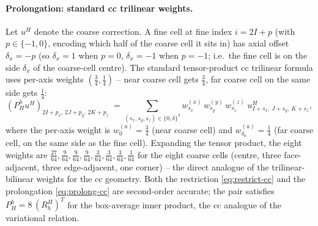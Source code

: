 \documentclass[11pt]{article}
\theoremstyle{definition}
\begin{document}
\paragraph{Prolongation: standard cc trilinear weights.}
Let $u^H$ denote the coarse correction.  A fine cell at fine index
$i = 2I + p$ (with $p \in \{-1, 0\}$, encoding which half of the
coarse cell it sits in) has axial offset $\delta_x = -p$
(so $\delta_x = 1$ when $p = 0$, $\delta_x = -1$ when $p = -1$;
i.e.\ the fine cell is on the side $\delta_x$ of the coarse-cell
centre).  The standard tensor-product cc trilinear formula uses
per-axis weights $(\tfrac{3}{4}, \tfrac{1}{4})$ -- near coarse cell
gets $\tfrac{3}{4}$, far coarse cell on the same side gets
$\tfrac{1}{4}$:
\begin{equation}\label{eq:prolong-cc}
  (P_H^h u^H)_{2I+p_x,\,2J+p_y,\,2K+p_z}
  \;=\!\!\!
  \sum_{(s_x,s_y,s_z)\in\{0,\delta\}^3}\!\!
  w^{(x)}_{s_x}\,w^{(y)}_{s_y}\,w^{(z)}_{s_z}\;
  u^H_{I+s_x,\,J+s_y,\,K+s_z},
\end{equation}
where the per-axis weight is
$w^{(a)}_0 = \tfrac{3}{4}$ (near coarse cell) and
$w^{(a)}_{\delta_a} = \tfrac{1}{4}$ (far coarse cell, on the same
side as the fine cell).  Expanding the tensor product, the eight
weights are $\tfrac{27}{64}, \tfrac{9}{64}, \tfrac{9}{64},
\tfrac{9}{64}, \tfrac{3}{64}, \tfrac{3}{64}, \tfrac{3}{64},
\tfrac{1}{64}$ for the eight coarse cells (centre, three
face-adjacent, three edge-adjacent, one corner) -- the
direct analogue of the trilinear-bilinear weights for the cc
geometry.  Both the restriction \eqref{eq:restrict-cc} and the
prolongation \eqref{eq:prolong-cc} are second-order accurate; the
pair satisfies $P_H^h = 8\,(R_h^H)^T$ for the box-average inner
product, the cc analogue of the variational relation.
\end{document}
